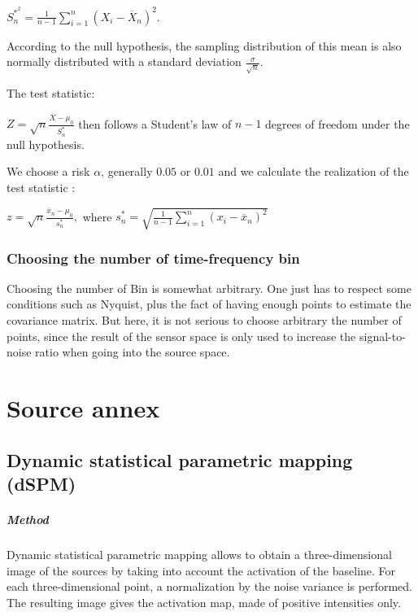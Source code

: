 $S^{\ast ^2}_n = \frac{1}{n-1}\sum\limits_{i=1}^n (X_i - \overline X_n )^2$.

According to the null hypothesis, the sampling distribution of this mean is also normally distributed with a standard deviation $\frac{\sigma}{\sqrt{n}}$.

The test statistic:

$ Z = \sqrt{n}\frac{\overline{X} - \mu_0}{S^{\ast}_n}$
then follows a Student's law of $n-1$ degrees of freedom under the null hypothesis.

We choose a risk $\alpha$, generally $0.05$ or $0.01$ and we calculate the realization of the test statistic :

$z = \sqrt{n}\frac{\overline{x}_n - \mu_0}{s^{\ast}_n},$ where $s^{\ast}_n =\sqrt{\frac{1}{n-1}\sum\limits_{i=1}^n (x_i - \overline x_n )^2} $

\subsection{Choosing the number of time-frequency bin}

Choosing the number of Bin is somewhat arbitrary. One just has to respect some conditions such as Nyquist, plus the fact of having enough points to estimate the covariance matrix. But here, it is not serious to choose arbitrary the number of points, since the result of the sensor space is only used to increase the signal-to-noise ratio when going into the source space.

\chapter{Source annex}


\section{Dynamic statistical parametric mapping (dSPM)}

\paragraph{Method}

Dynamic statistical parametric mapping allows to obtain a three-dimensional image of the sources by taking into account the activation of the baseline. For each three-dimensional point, a normalization by the noise variance is performed. The resulting image gives the activation map, made of positive intensities only.

